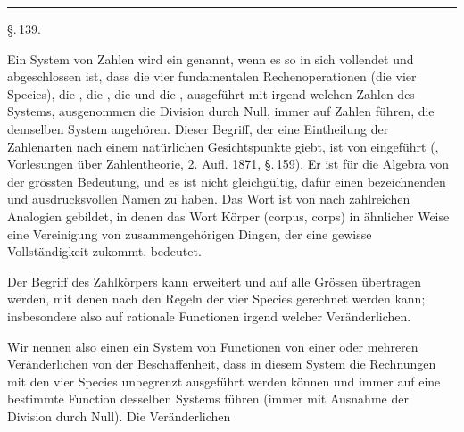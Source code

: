 
\begin{center}

\end{center}

\begin{center}
\rule{3cm}{0.4pt}
\end{center}

\begin{center}
\S.\,139.

\end{center}

Ein System von Zahlen wird ein  genannt, wenn es so in sich vollendet und abgeschlossen ist, dass die vier fundamentalen Rechenoperationen (die vier Species), die , die , die  und die , ausgef\"uhrt mit irgend welchen Zahlen des Systems, ausgenommen die Division durch Null, immer auf Zahlen f\"uhren, die demselben System angeh\"oren. Dieser Begriff, der eine Eintheilung der Zahlenarten nach einem nat\"urlichen Gesichtspunkte giebt, ist von  eingef\"uhrt (, Vorlesungen \"uber Zahlentheorie, 2. Aufl. 1871, \S.\,159). Er ist f\"ur die Algebra von der gr\"ossten Bedeutung, und es ist nicht gleichg\"ultig, daf\"ur einen bezeichnenden und ausdrucksvollen Namen zu haben. Das Wort  ist von  nach zahlreichen Analogien gebildet, in denen das Wort K\"orper (corpus, corps) in \"ahnlicher Weise eine Vereinigung von zusammengeh\"origen Dingen, der eine gewisse Vollst\"andigkeit zukommt, bedeutet.

Der Begriff des Zahlk\"orpers kann erweitert und auf alle Gr\"ossen \"ubertragen werden, mit denen nach den Regeln der vier Species gerechnet werden kann; insbesondere also auf rationale Functionen irgend welcher Ver\"anderlichen.

Wir nennen also einen  ein System von Functionen von einer oder mehreren Ver\"anderlichen von der Beschaffenheit, dass in diesem System die Rechnungen mit den vier Species unbegrenzt ausgef\"uhrt werden k\"onnen und immer auf eine bestimmte Function desselben Systems f\"uhren (immer mit Ausnahme der Division durch Null). Die Ver\"anderlichen
